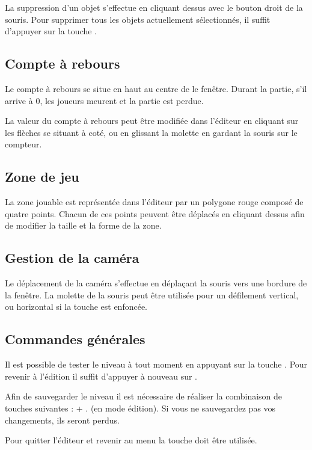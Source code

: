 La suppression d'un objet s'effectue en cliquant dessus avec le bouton
droit de la souris. Pour supprimer tous les objets actuellement sélectionnés,
il suffit d'appuyer sur la touche .

\subsection{Compte à rebours}

Le compte à rebours se situe en haut au centre de le fenêtre. Durant la partie,
s'il arrive à 0, les joueurs meurent et la partie est perdue.

La valeur du compte à rebours peut être modifiée dans l'éditeur en cliquant
sur les flèches se situant à coté, ou en glissant la molette en gardant la
souris sur le compteur.

\subsection{Zone de jeu}

La zone jouable est représentée dans l'éditeur par un polygone
rouge composé de quatre points. Chacun de ces points peuvent être
déplacés en cliquant dessus afin de modifier la taille et la
forme de la zone.

\subsection{Gestion de la caméra}

Le déplacement de la caméra s'effectue en déplaçant la souris vers
une bordure de la fenêtre. La molette de la souris peut être utilisée
pour un défilement vertical, ou horizontal si la touche 
est enfoncée.

\subsection{Commandes générales}

Il est possible de tester le niveau à tout moment en appuyant sur la
touche . Pour revenir à l'édition il suffit d'appuyer à
nouveau sur .

Afin de sauvegarder le niveau il est nécessaire de réaliser la
combinaison de touches suivantes :  + . (en mode édition).
Si vous ne sauvegardez pas vos changements, ils seront perdus.

Pour quitter l’éditeur et revenir au menu la touche  doit être utilisée.
